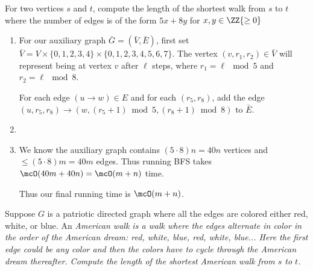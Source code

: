 \documentclass{article}
\begin{document}
\begin{subexercise} %
  For two vertices \( s \) and \( t \), compute the length of the shortest walk from \( s \) to \( t \) where the number of edges is of the form \( 5x+8y \) for \( x,y\in \ZZ{\geq 0} \)
\end{subexercise}

\begin{solution}

\begin{enumerate}[label=(\alph*)]
  \item For our auxiliary graph \( \bar G=(\bar V,\bar E) \), first set \( \bar V =V\times\{0,1,2,3,4\}\times\{0,1,2,3,4,5,6,7\} \).
  The vertex \( (v,r_1,r_2)\in\bar V \) will represent being at vertex \( v \) after \( \ell \) steps, where \( r_1=\ell\mod 5 \) and \( r_2=\ell\mod 8 \).

	For each edge \( (u \to w)\in E \) and for each \( (r_5,r_8) \), add the edge \( (u, r_5, r_8)\to(w, (r_5+1)\bmod 5, (r_8+1)\bmod 8) \) to \( \bar E \).
  \item {}

  \item We know the auxiliary graph contains \( (5\cdot 8) n = 40n \) vertices and \( \leq (5\cdot 8) m = 40m \) edges. Thus running BFS takes \( \mcO(40m+40n) = \mcO(m+n) \) time.

  Thus our final running time is \( \mcO(m+n) \).
\end{enumerate}
\end{solution}
\pagebreak

\begin{subexercise} %
  Suppose \( G \) is a patriotic directed graph where all the edges are colored either red, white, or blue.
  An \it{American walk} is a walk where the edges alternate in color in the order of the American dream: red, white, blue, red, white, blue...
  Here the first edge could be any color and then the colors have to cycle through the American dream thereafter.
  Compute the length of the shortest American walk from \( s \) to \( t \).
\end{subexercise}
\end{document}
